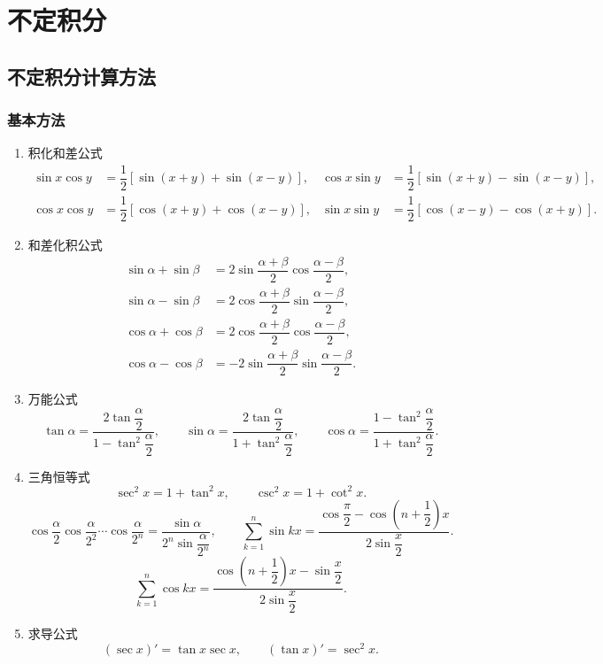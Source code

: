 \documentclass[../数学分析培优讲义.tex]{subfiles}
\begin{document}
\setcounter{chapter}{4}
\pagestyle{fancy}

\chapter{不定积分}


\section{不定积分计算方法}


\subsection{基本方法}

\begin{theorem}
\begin{enumerate}[label=\arabic*.]
    \item 积化和差公式
    \begin{align*}
        \sin x\cos y&=\dfrac{1}{2}[\sin(x+y)+\sin(x-y)],
        &\cos x\sin y&=\dfrac{1}{2}[\sin(x+y)-\sin(x-y)],\\
        \cos x\cos y&=\dfrac{1}{2}[\cos(x+y)+\cos(x-y)],
        &\sin x\sin y&=\dfrac{1}{2}[\cos(x-y)-\cos(x+y)].
    \end{align*}
    \item 和差化积公式
    \begin{align*}
        \sin\alpha+\sin\beta
        &=2\sin\dfrac{\alpha+\beta}{2}\cos\dfrac{\alpha-\beta}{2},\\
        \sin\alpha-\sin\beta
        &=2\cos\dfrac{\alpha+\beta}{2}\sin\dfrac{\alpha-\beta}{2},\\
        \cos\alpha+\cos\beta
        &=2\cos\dfrac{\alpha+\beta}{2}\cos\dfrac{\alpha-\beta}{2},\\
        \cos\alpha-\cos\beta
        &=-2\sin\dfrac{\alpha+\beta}{2}\sin\dfrac{\alpha-\beta}{2}.
    \end{align*}
    \item 万能公式
    \[
        \tan\alpha=\dfrac{2\tan\dfrac{\alpha}{2}}{1-\tan^2\dfrac{\alpha}{2}},
        \qquad
        \sin\alpha=\dfrac{2\tan\dfrac{\alpha}{2}}{1+\tan^2\dfrac{\alpha}{2}},
        \qquad
        \cos\alpha=\dfrac{1-\tan^2\dfrac{\alpha}{2}}{1+\tan^2\dfrac{\alpha}{2}}.
    \]
    \item 三角恒等式
    \[
        \sec^2x=1+\tan^2x,
        \qquad
        \csc^2x=1+\cot^2x.
    \]
    \[
        \cos\dfrac{\alpha}{2}\cos\dfrac{\alpha}{2^2}\cdots
        \cos\dfrac{\alpha}{2^n}
        =\dfrac{\sin\alpha}{2^n\sin\dfrac{\alpha}{2^n}},
        \qquad
        \sum\limits_{k=1}^n\sin kx
        =\dfrac{\cos\dfrac{\pi}{2}-\cos\left(n+\dfrac{1}{2}\right)x}
        {2\sin\dfrac{x}{2}}.
    \]
    \[
        \sum\limits_{k=1}^n\cos kx
        =\dfrac{\cos\left(n+\dfrac{1}{2}\right)x-\sin\dfrac{x}{2}}
        {2\sin\dfrac{x}{2}}.
    \]
    \item 求导公式
    \[
        (\sec x)'=\tan x\sec x,
        \qquad
        (\tan x)'=\sec^2x.
    \]
\end{enumerate}
\end{theorem}
\end{document}
